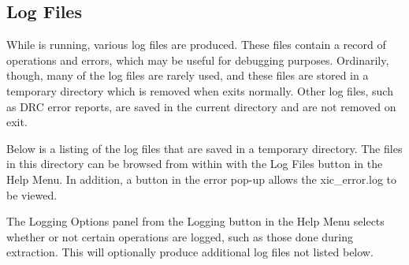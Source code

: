 \subsection{Log Files}
\label{logfiles}

While {\Xic} is running, various log files are produced.  These files
contain a record of operations and errors, which may be useful for
debugging purposes.  Ordinarily, though, many of the log files are
rarely used, and these files are stored in a temporary directory which
is removed when {\Xic} exits normally.  Other log files, such as DRC
error reports, are saved in the current directory and are not removed
on exit.

Below is a listing of the log files that are saved in a temporary
directory.  The files in this directory can be browsed from within
{\Xic} with the {\cb Log Files} button in the {\cb Help Menu}.  In
addition, a button in the error pop-up allows the {\vt xic\_error.log}
to be viewed.

The {\cb Logging Options} panel from the {\cb Logging} button in the
{\cb Help Menu} selects whether or not certain operations are logged,
such as those done during extraction.  This will optionally produce
additional log files not listed below.

